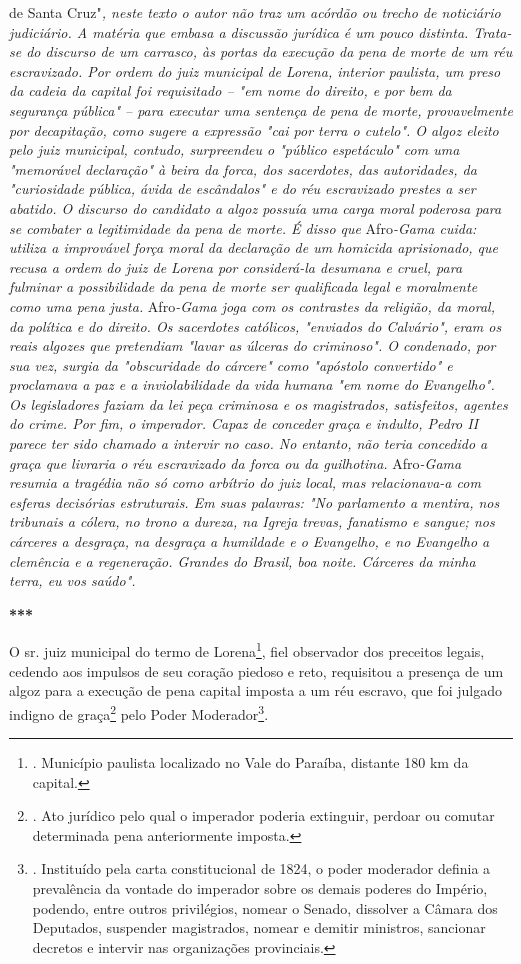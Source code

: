de Santa Cruz"\emph{, neste texto o autor não traz um acórdão ou trecho
de noticiário judiciário. A matéria que embasa a discussão jurídica é um
pouco distinta. Trata-se do discurso de um carrasco, às portas da
execução da pena de morte de um réu escravizado. Por ordem do juiz
municipal de Lorena, interior paulista, um preso da cadeia da capital
foi requisitado -- "em nome do direito, e por bem da segurança pública"
-- para executar uma sentença de pena de morte, provavelmente por
decapitação, como sugere a expressão "cai por terra o cutelo". O algoz
eleito pelo juiz municipal, contudo, surpreendeu o "público espetáculo"
com uma "memorável declaração" à beira da forca, dos sacerdotes, das
autoridades, da "curiosidade pública, ávida de escândalos" e do réu
escravizado prestes a ser abatido. O discurso do candidato a algoz
possuía uma carga moral poderosa para se combater a legitimidade da pena
de morte. É disso que} Afro\emph{-Gama cuida: utiliza a improvável força
moral da declaração de um homicida aprisionado, que recusa a ordem do
juiz de Lorena por considerá-la desumana e cruel, para fulminar a
possibilidade da pena de morte ser qualificada legal e moralmente como
uma pena justa.} Afro\emph{-Gama joga com os contrastes da religião, da
moral, da política e do direito. Os sacerdotes católicos, "enviados do
Calvário", eram os reais algozes que pretendiam "lavar as úlceras do
criminoso". O condenado, por sua vez, surgia da "obscuridade do cárcere"
como "apóstolo convertido" e proclamava a paz e a inviolabilidade da
vida humana "em nome do Evangelho". Os legisladores faziam da lei peça
criminosa e os magistrados, satisfeitos, agentes do crime. Por fim, o
imperador. Capaz de conceder graça e indulto, Pedro II parece ter sido
chamado a intervir no caso. No entanto, não teria concedido a graça que
livraria o réu escravizado da forca ou da guilhotina.} Afro\emph{-Gama
resumia a tragédia não só como arbítrio do juiz local, mas relacionava-a
com esferas decisórias estruturais. Em suas palavras: "No parlamento a
mentira, nos tribunais a cólera, no trono a dureza, na Igreja trevas,
fanatismo e sangue; nos cárceres a desgraça, na desgraça a humildade e o
Evangelho, e no Evangelho a clemência e a regeneração. Grandes do
Brasil, boa noite. Cárceres da minha terra, eu vos saúdo".}

\textbf{***}

O sr. juiz municipal do termo de Lorena\footnote{. Município paulista
  localizado no Vale do Paraíba, distante 180 km da capital.}, fiel
observador dos preceitos legais, cedendo aos impulsos de seu coração
piedoso e reto, requisitou a presença de um algoz para a execução de
pena capital imposta a um réu escravo, que foi julgado indigno de
graça\footnote{. Ato jurídico pelo qual o imperador poderia extinguir,
  perdoar ou comutar determinada pena anteriormente imposta.} pelo Poder
Moderador\footnote{. Instituído pela carta constitucional de 1824, o
  poder moderador definia a prevalência da vontade do imperador sobre os
  demais poderes do Império, podendo, entre outros privilégios, nomear o
  Senado, dissolver a Câmara dos Deputados, suspender magistrados,
  nomear e demitir ministros, sancionar decretos e intervir nas
  organizações provinciais.}.

